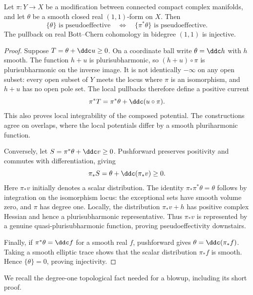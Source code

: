 \begin{lemma}\label{lem:lee-gauduchon-modification}
Let $\pi:Y\to X$ be a modification between connected compact complex manifolds, and let $\theta$ be a smooth closed real $(1,1)$-form on $X$. Then
\[
 \{\theta\}\text{ is pseudoeffective}
 \quad\Longleftrightarrow\quad
 \{\pi^*\theta\}\text{ is pseudoeffective}.
\]
The pullback on real Bott--Chern cohomology in bidegree $(1,1)$ is injective.
\end{lemma}
\begin{proof}
Suppose $T=\theta+\ddc u\geq0$. On a coordinate ball write $\theta=\ddc h$ with $h$ smooth. The function $h+u$ is plurisubharmonic, so $(h+u)\circ\pi$ is plurisubharmonic on the inverse image. It is not identically $-\infty$ on any open subset: every open subset of $Y$ meets the locus where $\pi$ is an isomorphism, and $h+u$ has no open pole set. The local pullbacks therefore define a positive current
\[
 \pi^*T=\pi^*\theta+\ddc(u\circ\pi).
\]
This also proves local integrability of the composed potential. The constructions agree on overlaps, where the local potentials differ by a smooth pluriharmonic function.

Conversely, let $S=\pi^*\theta+\ddc v\geq0$. Pushforward preserves positivity and commutes with differentiation, giving
\[
 \pi_*S=\theta+\ddc(\pi_*v)\geq0.
\]
Here $\pi_*v$ initially denotes a scalar distribution. The identity $\pi_*\pi^*\theta=\theta$ follows by integration on the isomorphism locus: the exceptional sets have smooth volume zero, and $\pi$ has degree one. Locally, the distribution $\pi_*v+h$ has positive complex Hessian and hence a plurisubharmonic representative. Thus $\pi_*v$ is represented by a genuine quasi-plurisubharmonic function, proving pseudoeffectivity downstairs.

Finally, if $\pi^*\theta=\ddc f$ for a smooth real $f$, pushforward gives $\theta=\ddc(\pi_*f)$. Taking a smooth elliptic trace shows that the scalar distribution $\pi_*f$ is smooth. Hence $\{\theta\}=0$, proving injectivity.
\end{proof}

We recall the degree-one topological fact needed for a blowup, including its short proof.

